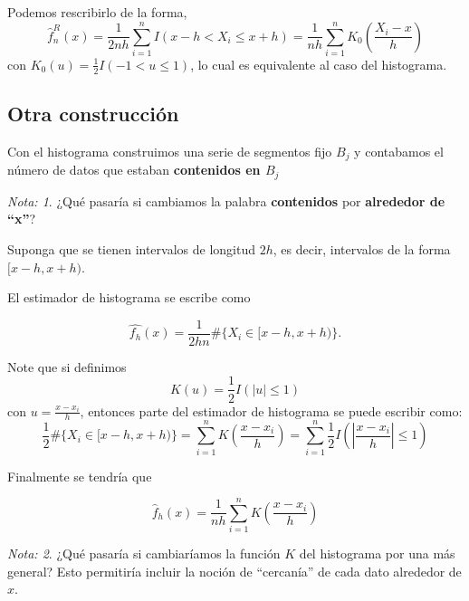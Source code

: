 \documentclass[
  12pt,
]{book}
\theoremstyle{definition}
\theoremstyle{definition}
\theoremstyle{definition}
\theoremstyle{definition}
\theoremstyle{remark}
\newtheorem*{remark}{Nota: }
\begin{document}
Podemos rescribirlo de la forma,
\[
\hat{f}_{n}^{R}(x)=\frac{1}{2nh}\sum_{i=1}^{n}I(x-h<X_{i}\leq x+h)=\frac{1}{nh}\sum_{i=1}^{n}K_{0}\left(\frac{X_{i}-x}{h}\right)
\]
con \(K_{0}(u)=\frac{1}{2}I(-1<u\leq1)\), lo cual es equivalente al caso del histograma.

\hypertarget{otra-construcciuxf3n}{%
\subsection{Otra construcción}\label{otra-construcciuxf3n}}

Con el histograma construimos una serie de segmentos fijo \(B_{j}\) y contabamos el número de datos que estaban \textbf{contenidos en \(B_{j}\)}

\begin{remark}
¿Qué pasaría si cambiamos la palabra \textbf{contenidos} por \textbf{alrededor de ``x''}?
\end{remark}

Suponga que se tienen intervalos de longitud \(2h\), es decir, intervalos de la forma \([x-h,x+h)\).

El estimador de histograma se escribe como

\begin{equation*}
\hat{f_{h}}(x) = \dfrac{1}{2hn} \# \{ X_i \in [x-h,x+h) \}.
\end{equation*}

Note que si definimos
\begin{equation*}
K(u)=\frac{1}{2} I \left( \left\vert u \right\vert \leq 1 \right)
\end{equation*}
con \(u = \frac{x-x_i}{h}\), entonces parte del estimador de histograma se puede escribir como:
\begin{equation*}
\frac{1}{2}\# \{ X_i \in [x-h,x+h) \}
=\sum_{i=1}^{n} K\left( \frac{x-x_{i}}{h} \right)
=\sum_{i=1}^{n}  \frac{1}{2} I \left( \left\vert \frac{x-x_{i}}{h}
\right\vert \leq 1 \right)
\end{equation*}

Finalmente se tendría que

\begin{equation*}
\hat{f}_{h}\left( x \right) = \frac{1}{nh}\sum_{i=1}^{n} K\left( \frac{x-x_{i}}{h} \right)
\end{equation*}

\begin{remark}
¿Qué pasaría si cambiaríamos la función \(K\) del histograma por una más general? Esto permitiría incluir la noción de ``cercanía'' de cada dato alrededor de \(x\).
\end{remark}
\end{document}

